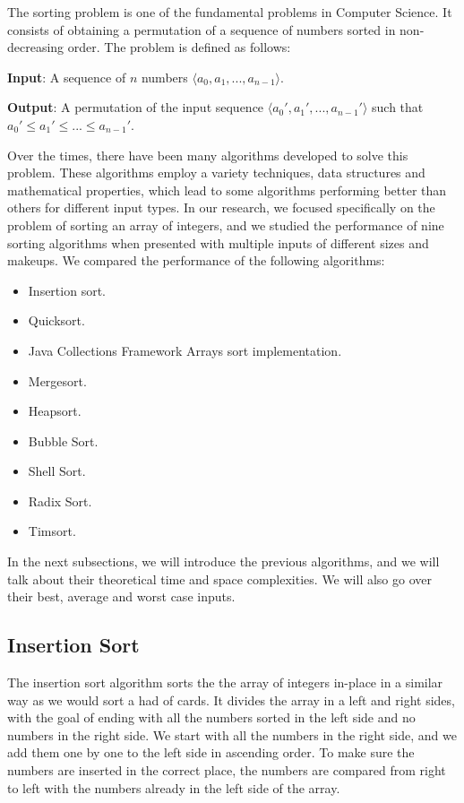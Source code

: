 The sorting problem is one of the fundamental problems in Computer Science. It consists of obtaining a permutation of a sequence of numbers sorted in non-decreasing order. The problem is defined as follows\cite{clrs2009}:

\textbf{Input}: A sequence of $n$ numbers $\langle a_0, a_1, ..., a_{n-1} \rangle$.

\textbf{Output}: A permutation of the input sequence $\langle a_0', a_1', ..., a_{n-1}' \rangle$ such that $a_0' \leq a_1' \leq ... \leq a_{n-1}'$.

Over the times, there have been many algorithms developed to solve this problem. These algorithms employ a variety techniques, data structures and mathematical properties, which lead to some algorithms performing better than others for different input types. In our research, we focused specifically on the problem of sorting an array of integers, and we studied the performance of nine sorting algorithms when presented with multiple inputs of different sizes and makeups. We compared the performance of the following algorithms:

\begin{itemize}
  \item Insertion sort.
  \item Quicksort.
  \item Java Collections Framework Arrays sort implementation.
  \item Mergesort.
  \item Heapsort.
  \item Bubble Sort.
  \item Shell Sort.
  \item Radix Sort.
  \item Timsort.
\end{itemize}

In the next subsections, we will introduce the previous algorithms, and we will talk about their theoretical time and space complexities. We will also go over their best, average and worst case inputs.


\subsection{Insertion Sort}

The insertion sort algorithm sorts the the array of integers in-place in a similar way as we would sort a had of cards. It divides the array in a left and right sides, with the goal of ending with all the numbers sorted in the left side and no numbers in the right side. We start with all the numbers in the right side, and we add them one by one to the left side in ascending order. To make sure the numbers are inserted in the correct place, the numbers are compared from right to left with the numbers already in the left side of the array\cite{clrs2009}.

